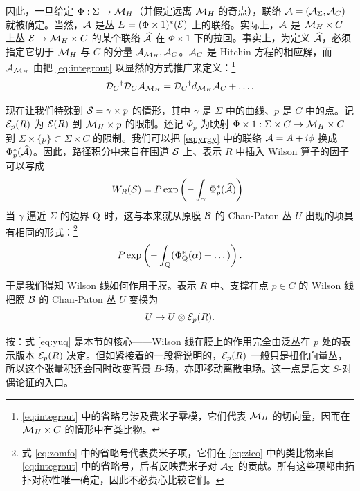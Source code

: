 因此，一旦给定 $\Phi:\Sigma\to \MH$（并假定远离 $\MH$ 的奇点），联络 $\CA=(\cA_\Sigma,\cA_C)$ 就被确定。当然，$\CA$ 是丛 $E=(\Phi\times 1)^*({\EUE})$ 上的联络。实际上，$\CA$ 是 $\MH\times C$ 上丛 ${\EUE}\to \MH\times C$ 的某个联络 $\hat\CA$ 在 $\Phi\times 1$ 下的拉回。事实上，为定义 $\hat\CA$，必须指定它切于 $\MH$ 与 $C$ 的分量 $\CA_{\MH},\CA_C$。$\CA_C$ 是 Hitchin 方程的相应解，而 $\CA_{\MH}$ 由把 \eqref{eq:integrout} 以显然的方式推广来定义：\footnote{\eqref{eq:integrout} 中的省略号涉及费米子零模，它们代表 $\MH$ 的切向量，因而在 $\MH\times C$ 的情形中有类比物。}
\setcounter{equation}{3}
\begin{equation}\label{eq:pintegrout}
\cD_C{}^\dagger \cD_C \cA_{\M_H}=\cD_C{}^\dagger
d_{{\eusm M}_H} \cA_C+\dots.
\end{equation}

现在让我们特殊到 ${\cal S}=\gamma\times p$ 的情形，其中 $\gamma$ 是 $\Sigma$ 中的曲线、$p$ 是 $C$ 中的点。记 ${\EUE}_p(R)$ 为 ${\EUE}(R)$ 到 $\MH\times p$ 的限制。还记 $\Phi_p$ 为映射 $\Phi\times 1:\Sigma\times C\to \MH\times C$ 到 $\Sigma\times\{p\}\subset \Sigma\times C$ 的限制。我们可以把 \eqref{eq:yrgy} 中的联络 $\CA=A+i\phi$ 换成 $\Phi_p^*(\hat\CA)$。因此，路径积分中来自在围道 ${\cal S}$ 上、表示 $R$ 中插入 Wilson 算子的因子可以写成 %
\setcounter{equation}{4}
\begin{equation}\label{eq:zico}
W_R({{\cal S}})=
P\exp\left(-\int_\gamma\,\Phi_p^*(\hat\CA)\right).
\end{equation}
 当 $\gamma$ 逼近 $\Sigma$ 的边界 $\eurm Q$ 时，这与本来就从原膜 ${\cal B}$ 的 Chan-Paton 丛 $U$ 出现的项具有相同的形式：\footnote{式 \eqref{eq:zomfo} 中的省略号代表费米子项，它们在 \eqref{eq:zico} 中的类比物来自 \eqref{eq:integrout} 中的省略号，后者反映费米子对 $\CA_\Sigma$ 的贡献。所有这些项都由拓扑对称性唯一确定，因此不必费心比较它们。} %
\setcounter{equation}{5}
\begin{equation}\label{eq:zomfo}
P\exp\left(-\int_{\eurm Q} (\Phi_{\eurm Q}^*(\alpha)
+\dots)\right).
\end{equation}

于是我们得知 Wilson 线如何作用于膜。表示 $R$ 中、支撑在点 $p\in C$ 的 Wilson 线把膜 ${\cal B}$ 的 Chan-Paton 丛 $U$ 变换为 %
\setcounter{equation}{6}
\begin{equation}\label{eq:yuq}
U\to
U\otimes {\EUE}_p(R).
\end{equation}

\begin{yizhu}[物理图像]
按：式 \eqref{eq:yuq} 是本节的核心——Wilson 线在膜上的作用完全由泛丛在 $p$ 处的表示版本 ${\EUE}_p(R)$ 决定。但如紧接着的一段将说明的，${\EUE}_p(R)$ 一般只是扭化向量丛，所以这个张量积还会同时改变背景 $B$-场，亦即移动离散电场。这一点是后文 $S$-对偶论证的入口。
\end{yizhu}

